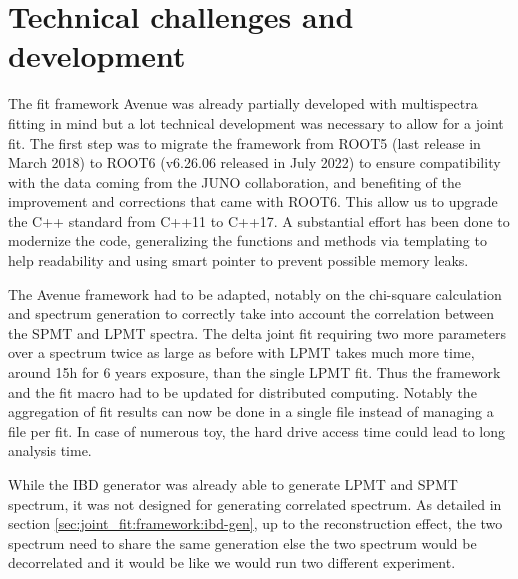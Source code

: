 \documentclass[../main.tex]{subfiles}
\begin{document}
%
%
%
\section{Technical challenges and development}
\label{sec:joint_fit:tech}

The fit framework Avenue was already partially developed with multispectra fitting in mind but a lot technical development was necessary to allow for a joint fit. The first step was to migrate the framework from ROOT5 (last release in March 2018) to ROOT6 (v6.26.06 released in July 2022) to ensure compatibility with the data coming from the JUNO collaboration, and benefiting of the improvement and corrections that came with ROOT6. This allow us to upgrade the C++ standard from C++11 to C++17. A substantial effort has been done to modernize the code, generalizing the functions and methods via templating to help readability and using smart pointer to prevent possible memory leaks.

The Avenue framework had to be adapted, notably on the chi-square calculation and spectrum generation to correctly take into account the correlation between the SPMT and LPMT spectra. The delta joint fit requiring two more parameters over a spectrum twice as large as before with LPMT takes much more time, around 15h for 6 years exposure, than the single LPMT fit. Thus the framework and the fit macro had to be updated for distributed computing. Notably the aggregation of fit results can now be done in a single file instead of managing a file per fit. In case of numerous toy, the hard drive access time could lead to long analysis time.

While the IBD generator was already able to generate LPMT and SPMT spectrum, it was not designed for generating correlated spectrum. As detailed in section \ref{sec:joint_fit:framework:ibd-gen}, up to the reconstruction effect, the two spectrum need to share the same generation else the two spectrum would be decorrelated and it would be like we would run two different experiment.
\end{document}
